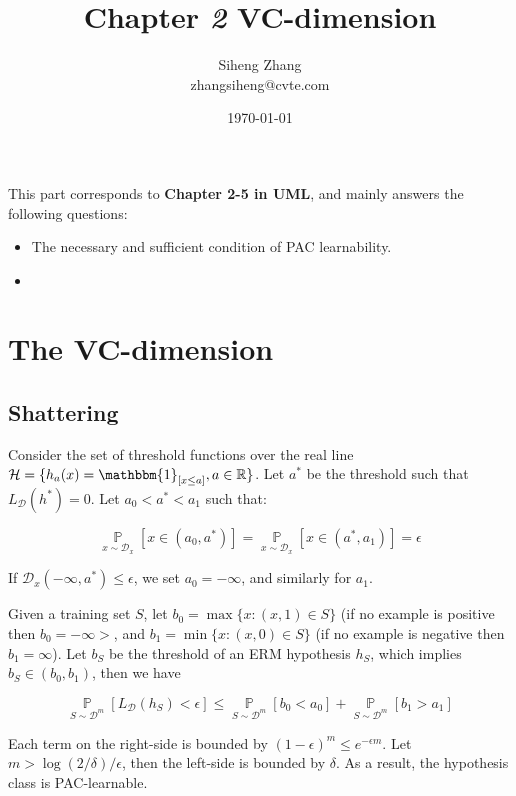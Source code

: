 \documentclass{article}
\author{Siheng Zhang\\zhangsiheng@cvte.com}
\title{Chapter \textbf{\textit{2}} VC-dimension}
\date{\today}
\begin{document}
\maketitle  

This part corresponds to \textbf{Chapter 2-5 in UML}, and mainly answers the following questions:

\begin{itemize}
\item The necessary and sufficient condition of PAC learnability.
\item 
\end{itemize}

\tableofcontents
\newpage

\section{The VC-dimension}

\subsection{Shattering}

Consider the set of threshold functions over the real line $\mathcal{H}=\{h_a(x)=\mathbbm{1}_{[x\leq a]},a\in\mathbb{R}\}$. Let $a^*$ be the threshold such that $L_\mathcal{D}(h^*)=0$. Let $a_0<a^*<a_1$ such that:

\begin{equation*}
\mathop{\mathbb{P}}\limits_{x\sim\mathcal{D}_x}[x\in(a_0,a^*)]=\mathop{\mathbb{P}}\limits_{x\sim\mathcal{D}_x}[x\in(a^*,a_1)]=\epsilon
\end{equation*}

If $\mathcal{D}_x(-\infty,a^*)\leq\epsilon$, we set $a_0=-\infty$, and similarly for $a_1$.

Given a training set $S$, let $b_0=\max\{x:(x,1)\in S\}$ (if no example is positive then $b_0=-\infty>$, and $b_1=\min\{x:(x,0)\in S\}$ (if no example is negative then $b_1=\infty$). Let $b_S$ be the threshold of an ERM hypothesis $h_S$, which implies $b_S\in(b_0,b_1)$, then we have

\begin{equation*}
\mathop{\mathbb{P}}\limits_{S\sim\mathcal{D}^m}[L_\mathcal{D}(h_S)<\epsilon]\leq\mathop{\mathbb{P}}\limits_{S\sim\mathcal{D}^m}[b_0<a_0]+\mathop{\mathbb{P}}\limits_{S\sim\mathcal{D}^m}[b_1>a_1]
\end{equation*}

Each term on the right-side is bounded by $(1-\epsilon)^m\leq e^{-\epsilon m}$. Let $m>\log(2/\delta)/\epsilon$, then the left-side is bounded by $\delta$. As a result, the hypothesis class is PAC-learnable.
\end{document}
